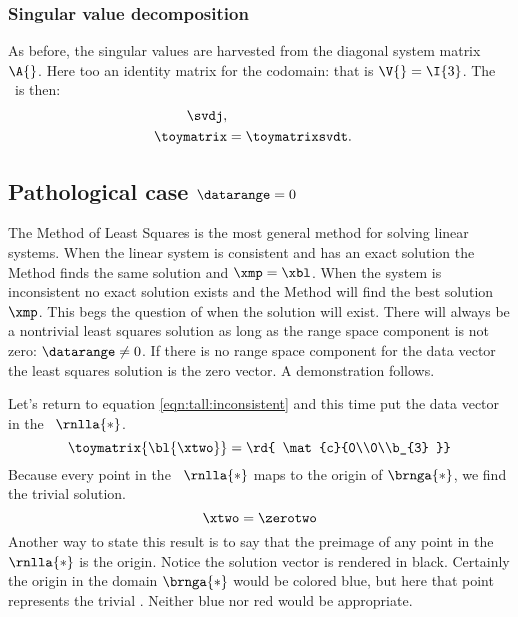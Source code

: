 \subsubsection{Singular value decomposition}
As before, the singular values are harvested from the diagonal system matrix $\A{}$. Here too an identity matrix for the codomain: that is $\V{} = \I{3}$. The \asvd\ is then:
%
\begin{equation}
  \begin{split}
    \svdj, \\
    \toymatrix &= \toymatrixsvdt .
  \end{split}
\end{equation}

\subsection{Pathological case $\datarange = 0$}
The Method of Least Squares is the most general method for solving linear systems. When the linear system is consistent and has an exact solution the Method finds the same solution and $\xmp=\xbl$. When the system is inconsistent no exact solution exists and the Method will find the best solution $\xmp$. This begs the question of when the solution will exist. There will always be a nontrivial least squares solution as long as the range space component is not zero: $\datarange \ne 0$. If there is no range space component for the data vector the least squares solution is the zero vector. A demonstration follows.

Let's return to equation \eqref{eqn:tall:inconsistent} and this time put the data vector in the \ns\ $\rnlla{*}$.
%
\begin{equation}
    \toymatrix {\bl{ \xtwo }} = {\rd{ \mat{c}{0\\0\\b_{3} }}}
 \label{eqn:tall:pathological}
\end{equation}
%
Because every point in the \ns\ $\rnlla{*}$ maps to the origin of $\brnga{*}$, we find the trivial solution.
%
\begin{equation}
  \xtwo = \zerotwo
\end{equation}
%
Another way to state this result is to say that the preimage of any point in the \ns\ $\rnlla{*}$ is the origin. Notice the solution vector is rendered in black. Certainly the origin in the domain $\brnga{*}$ would be colored blue, but here that point represents the trivial \ns. Neither blue nor red would be appropriate.


